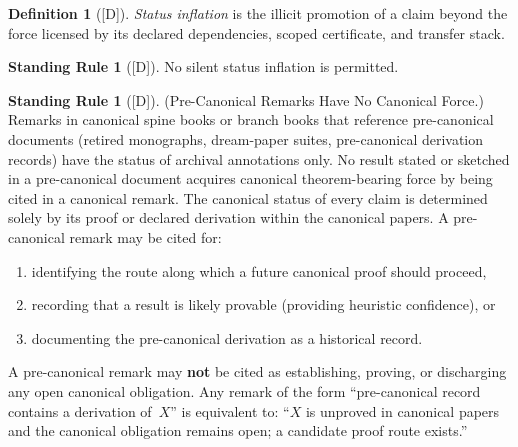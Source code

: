 \documentclass[12pt,oneside]{amsbook}
\theoremstyle{plain}
\theoremstyle{definition}
\newtheorem{definition}[theorem]{Definition}
\newtheorem{standingrule}[theorem]{Standing Rule}
\theoremstyle{remark}
\newcommand{\status}[1]{\textup{[#1]}}
\begin{document}
\begin{definition}[\status{D}]\label{def:status-inflation}
\emph{Status inflation} is the illicit promotion of a claim beyond
the force licensed by its declared dependencies, scoped certificate,
and transfer stack.
\end{definition}

\begin{standingrule}[\status{D}]\label{sr:no-inflation}
No silent status inflation is permitted.
\end{standingrule}

\begin{standingrule}[\status{D}]\label{sr:precanonical-force}
\textup{(Pre-Canonical Remarks Have No Canonical Force.)}
Remarks in canonical spine books or branch books that reference
pre-canonical documents (retired monographs, dream-paper suites,
pre-canonical derivation records) have the status of archival
annotations only.  No result stated or sketched in a pre-canonical
document acquires canonical theorem-bearing force by being cited in
a canonical remark.  The canonical status of every claim is
determined solely by its proof or declared derivation within the
canonical papers.  A pre-canonical remark may be cited for:
\begin{enumerate}[label=\textup{(\roman*)}]
  \item identifying the route along which a future canonical proof
    should proceed,
  \item recording that a result is likely provable (providing
    heuristic confidence), or
  \item documenting the pre-canonical derivation as a historical
    record.
\end{enumerate}
A pre-canonical remark may \textbf{not} be cited as establishing,
proving, or discharging any open canonical obligation.  Any remark
of the form ``pre-canonical record contains a derivation of~$X$''
is equivalent to: ``$X$ is unproved in canonical papers and the
canonical obligation remains open; a candidate proof route exists.''
\end{standingrule}
\end{document}
